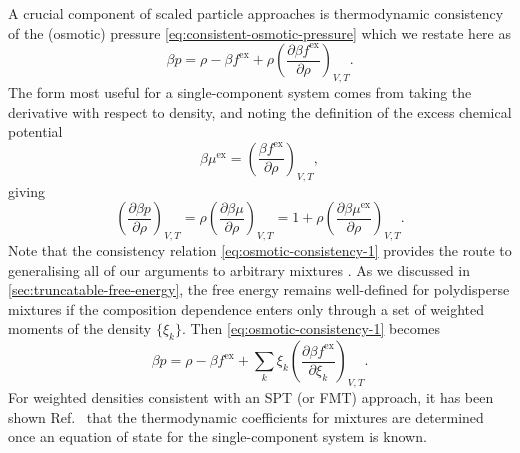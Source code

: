\documentclass[11pt,twoside]{report}
\begin{document}
A crucial component of scaled particle approaches is thermodynamic consistency of the (osmotic) pressure \eqref{eq:consistent-osmotic-pressure} which we restate here as%
\begin{equation}\label{eq:osmotic-consistency-1}
  \beta p
  =
  \rho - \beta f^\mathrm{ex}
  + \rho \left( \frac{\partial \beta f^\mathrm{ex}}{\partial \rho} \right)_{V,T}.
\end{equation}
The form most useful for a single-component system comes from taking the derivative with respect to density, and noting the definition of the excess chemical potential
\begin{equation*}
  \beta \mu^\mathrm{ex}
  =
  \left( \frac{\beta f^\mathrm{ex}}{\partial \rho} \right)_{V,T},
\end{equation*}
giving
\begin{equation}\label{eq:osmotic-consistency-2}
    \left( \frac{\partial \beta p}{\partial \rho} \right)_{V,T}
    =
    \rho \left( \frac{\partial \beta \mu}{\partial \rho} \right)_{V,T}
    =
    1 + \rho \left( \frac{\partial \beta \mu^\mathrm{ex}}{\partial \rho} \right)_{V,T}.
\end{equation}
Note that the consistency relation \eqref{eq:osmotic-consistency-1} provides the route to generalising all of our arguments to arbitrary mixtures \cite{RosenfeldPRL1989,SollichAiCP2001,SantosPRE2012}.
As we discussed in \ref{sec:truncatable-free-energy}, the free energy remains well-defined for polydisperse mixtures if the composition dependence enters only through a set of weighted moments of the density $\{\xi_k\}$.
Then \eqref{eq:osmotic-consistency-1} becomes
\begin{equation}\label{eq:osmotic-consistency-3}
  \beta p
  =
  \rho - \beta f^\mathrm{ex}
  + \sum_k
  \xi_k \left( \frac{\partial \beta f^\mathrm{ex}}{\partial \xi_k} \right)_{V,T}.
\end{equation}
For weighted densities consistent with an SPT (or FMT) approach, it has been shown Ref.\ \cite{SantosPRE2012} that the thermodynamic coefficients for mixtures are determined once an equation of state for the single-component system is known.
\end{document}
